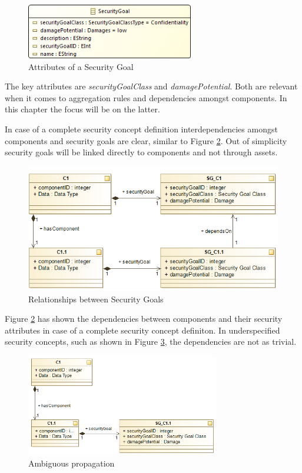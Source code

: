 \begin{figure}[H]
\centering
\includegraphics[width=0.65\textwidth]{pictures/securitygoal.png}
\caption{Attributes of a Security Goal}
\label{fig:security_goal}
\end{figure} 

The key attributes are \textit{securityGoalClass} and \textit{damagePotential}. Both are relevant when it comes to aggregation rules and dependencies amongst components. In this chapter the focus will be on the latter.

In case of a complete security concept definition interdependencies amongst components and security goals are clear, similar to Figure \ref{fig:subcomponent}. Out of simplicity security goals will be linked directly to components and not through assets.

\begin{figure}[H]
\centering
\includegraphics[scale=0.75]{pictures/rel_component.png}
\caption{Relationships between Security Goals}
\label{fig:subcomponent}
\end{figure} 

Figure \ref{fig:subcomponent} has shown the dependencies between components and their security attributes in case of a complete security concept definiton. In underspecified security concepts, such as shown in Figure \ref{fig:subcomponent_dilemma}, the dependencies are not as trivial. 

\begin{figure}[H]
\centering
\includegraphics[width=0.75\textwidth]{pictures/sg_dilemma_no_goal.png}
\caption{Ambiguous propagation}
\label{fig:subcomponent_dilemma}
\end{figure} 

